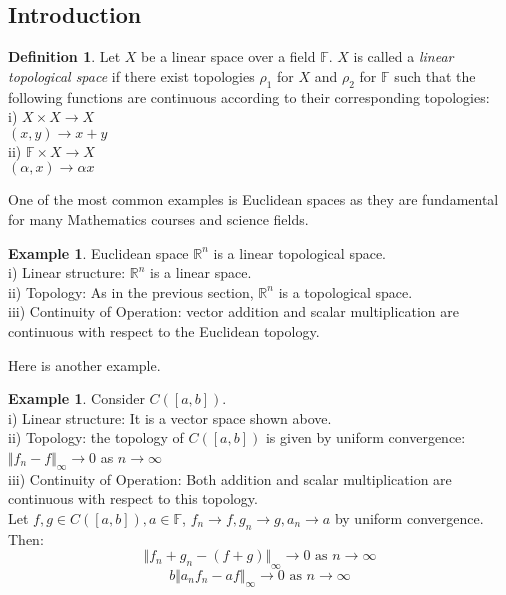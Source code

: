 \documentclass[12pt, reqno]{amsart}
\theoremstyle{definition}
\newtheorem{definition}[theorem]{Definition}
\newtheorem{example}[theorem]{Example}
\numberwithin{equation}{section}
\newcommand{\dR}{{\mathbb R}}
\newcommand{\dF}{{\mathbb F}}
\begin{document}
\subsection{Introduction}
\begin{definition}
    Let $X$ be a linear space over a field $\dF$. $X$ is called a \textit{linear topological space} if there exist topologies $\rho_1$ for $X$ and $\rho_2$ for $\dF$ such that the following functions are continuous according to their corresponding topologies:\\
    i) $X \times X \longrightarrow X$\\
    \hspace*{0.55cm} $(x,y) \longrightarrow x+y$\\
    ii) $\dF \times X \longrightarrow X$\\
    \hspace*{0.55cm} $(\alpha,x) \longrightarrow \alpha x$
\end{definition}
One of the most common examples is Euclidean spaces as they are fundamental for many Mathematics courses and science fields.
\begin{example}
Euclidean space $\dR ^n$ is a linear topological space.\\
i) Linear structure: $\dR ^n$ is a linear space.\\
ii) Topology: As in the previous section, $\dR ^n$ is a topological space.\\
iii) Continuity of Operation: vector addition and scalar multiplication are continuous with respect to the Euclidean topology.
\end{example}

Here is another example.

\begin{example}
Consider $C([a,b])$.\\
i) Linear structure: It is a vector space shown above.\\
ii) Topology: the topology of $C([a,b])$ is given by uniform convergence: ${\Vert f_n - f\Vert}_\infty \longrightarrow 0$ as $n \longrightarrow \infty$\\ 
iii) Continuity of Operation: Both addition and scalar multiplication are continuous with respect to this topology.\\
Let $f, g \in C([a,b]), a \in \dF$, $f_n \longrightarrow f, g_n \longrightarrow g, a_n \longrightarrow a$ by uniform convergence. Then:
\[{\Vert f_n +g_n - (f+g)\Vert }_\infty \longrightarrow 0 \text{ as } n \longrightarrow \infty \]
\[b {\Vert {a_n}{f_n} - af\Vert}_\infty \longrightarrow 0 \text{ as } n \longrightarrow \infty\]
\end{example}
\end{document}
